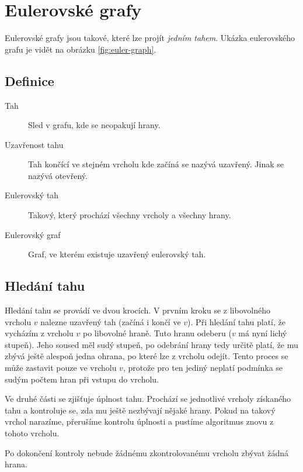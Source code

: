 \section{Eulerovské grafy}

Eulerovské grafy jsou takové, které lze projít \textit{jedním tahem}.
Ukázka eulerovského grafu je vidět na obrázku \ref{fig:euler-graph}.


\subsection{Definice}

\begin{description}
    \item[Tah] Sled v grafu, kde se neopakují hrany.
    \item[Uzavřenost tahu] Tah končící ve stejném vrcholu kde začíná se nazývá uzavřený.
    Jinak se nazývá otevřený.
    \item[Eulerovský tah] Takový, který prochází všechny vrcholy a všechny hrany.
    \item[Eulerovský graf] Graf, ve kterém existuje uzavřený eulerovský tah.
\end{description}


\subsection{Hledání tahu}

Hledání tahu se provádí ve dvou krocích.
V prvním kroku se z libovolného vrcholu $v$ nalezne uzavřený tah (začíná i končí ve $v$).
Při hledání tahu platí, že vycházím z vrcholu $v$ po libovolné hraně.
Tuto hranu odeberu ($v$ má nyní lichý stupeň).
Jeho soused měl sudý stupeň, po odebrání hrany tedy určitě platí, že mu zbývá ještě alespoň jedna ohrana, po které lze z vrcholu odejít.
Tento proces se může zastavit pouze ve vrcholu $v$, protože pro ten jediný neplatí podmínka se sudým počtem hran při vstupu do vrcholu.

Ve druhé části se zjišťuje úplnost tahu.
Prochází se jednotlivé vrcholy získaného tahu a kontroluje se, zda mu ještě nezbývají nějaké hrany.
Pokud na takový vrchol narazíme, přerušíme kontrolu úplnosti a pustíme algoritmus znovu z tohoto vrcholu.

Po dokončení kontroly nebude žádnému zkontrolovanému vrcholu zbývat žádná hrana.

